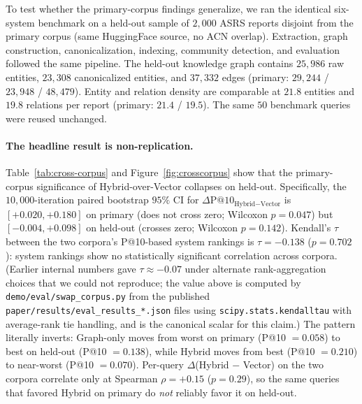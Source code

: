 \documentclass[10pt,a4paper]{article}
\begin{document}
To test whether the primary-corpus findings generalize, we ran the
identical six-system benchmark on a held-out sample of $2{,}000$
ASRS reports disjoint from the primary corpus (same HuggingFace
source, no ACN overlap). Extraction, graph construction,
canonicalization, indexing, community detection, and evaluation
followed the same pipeline. The held-out knowledge graph contains
$25{,}986$ raw entities, $23{,}308$ canonicalized entities, and
$37{,}332$ edges (primary: $29{,}244$ / $23{,}948$ / $48{,}479$).
Entity and relation density are comparable at $21.8$ entities and
$19.8$ relations per report (primary: $21.4$ / $19.5$). The same $50$
benchmark queries were reused unchanged.

\paragraph{The headline result is non-replication.} Table~\ref{tab:cross-corpus}
and Figure~\ref{fig:crosscorpus} show that the primary-corpus
significance of Hybrid-over-Vector collapses on held-out. Specifically,
the $10{,}000$-iteration paired bootstrap $95\%$ CI for
$\Delta\text{P@}10_{\text{Hybrid}-\text{Vector}}$ is
$[+0.020, +0.180]$ on primary (does not cross zero; Wilcoxon
$p = 0.047$) but $[-0.004, +0.098]$ on held-out
(crosses zero; Wilcoxon $p = 0.142$). Kendall's $\tau$
between the two corpora's P@10-based system rankings is
$\tau = -0.138$ ($p = 0.702$): system rankings show no
statistically significant correlation across corpora. (Earlier
internal numbers gave $\tau \approx -0.07$ under alternate
rank-aggregation choices that we could not reproduce; the value
above is computed by \texttt{demo/eval/swap\_corpus.py} from the
published \texttt{paper/results/eval\_results\_*.json} files using
\texttt{scipy.stats.kendalltau} with average-rank tie handling, and
is the canonical scalar for this claim.) The
pattern literally inverts: Graph-only moves from worst on primary
(P@10 $= 0.058$) to best on held-out
(P@10 $= 0.138$), while Hybrid moves from best
(P@10 $= 0.210$) to near-worst
(P@10 $= 0.070$). Per-query $\Delta$(Hybrid $-$ Vector) on
the two corpora correlate only at Spearman
$\rho = +0.15$ ($p = 0.29$), so the same queries that favored
Hybrid on primary do \emph{not} reliably favor it on held-out.
\end{document}
